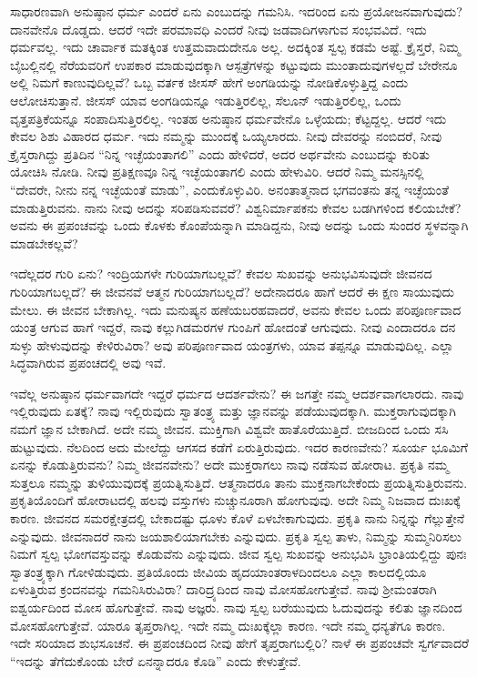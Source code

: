 ಸಾಧಾರಣವಾಗಿ ಅನುಷ್ಠಾನ ಧರ್ಮ ಎಂದರೆ ಏನು ಎಂಬುದನ್ನು ಗಮನಿಸಿ. ಇದರಿಂದ ಏನು ಪ್ರಯೋಜನವಾಗುವುದು? ದಾನವೇನೊ ದೊಡ್ಡದು. ಆದರೆ ಇದೇ ಪರಮಾವಧಿ ಎಂದರೆ ನೀವು ಜಡವಾದಿಗಳಾಗುವ ಸಂಭವವಿದೆ. ಇದು ಧರ್ಮವಲ್ಲ. ಇದು ಚಾರ್ವಾಕ ಮತಕ್ಕಿಂತ ಉತ್ತಮವಾದುದೇನೂ ಅಲ್ಲ. ಅದಕ್ಕಿಂತ ಸ್ವಲ್ಪ ಕಡಮೆ ಅಷ್ಟೆ. ಕ್ರೈಸ್ತರೆ, ನಿಮ್ಮ ಬೈಬಲ್ಲಿನಲ್ಲಿ ನೆರೆಯವರಿಗೆ ಉಪಕಾರ ಮಾಡುವುದಕ್ಕಾಗಿ ಆಸ್ಪತ್ರೆಗಳನ್ನು ಕಟ್ಟುವುದು ಮುಂತಾದುವುಗಳಲ್ಲದೆ ಬೇರೇನೂ ಅಲ್ಲಿ ನಿಮಗೆ ಕಾಣುವುದಿಲ್ಲವೆ? ಒಬ್ಬ ವರ್ತಕ ಜೀಸಸ್ ಹೇಗೆ ಅಂಗಡಿಯನ್ನು ನೋಡಿಕೊಳ್ಳುತ್ತಿದ್ದ ಎಂದು ಆಲೋಚಿಸುತ್ತಾನೆ. ಜೀಸಸ್ ಯಾವ ಅಂಗಡಿಯನ್ನೂ ಇಡುತ್ತಿರಲಿಲ್ಲ, ಸೆಲೂನ್ ಇಡುತ್ತಿರಲಿಲ್ಲ, ಒಂದು ವೃತ್ತಪತ್ರಿಕೆಯನ್ನೂ ಸಂಪಾದಿಸುತ್ತಿರಲಿಲ್ಲ. ಇಂತಹ ಅನುಷ್ಠಾನ ಧರ್ಮವೇನೊ ಒಳ್ಳೆಯದು; ಕೆಟ್ಟದ್ದಲ್ಲ. ಆದರೆ ಇದು ಕೇವಲ ಶಿಶು ವಿಹಾರದ ಧರ್ಮ. ಇದು ನಮ್ಮನ್ನು ಮುಂದಕ್ಕೆ ಒಯ್ಯಲಾರದು. ನೀವು ದೇವರನ್ನು ನಂಬಿದರೆ, ನೀವು ಕ್ರೈಸ್ತರಾಗಿದ್ದು ಪ್ರತಿದಿನ “ನಿನ್ನ ಇಚ್ಛೆಯಂತಾಗಲಿ” ಎಂದು ಹೇಳಿದರೆ, ಅದರ ಅರ್ಥವೇನು ಎಂಬುದನ್ನು ಕುರಿತು ಯೋಚಿಸಿ ನೋಡಿ. ನೀವು ಪ್ರತಿಕ್ಷಣವೂ ನಿನ್ನ ಇಚ್ಛೆಯಂತಾಗಲಿ ಎಂದು ಹೇಳುವಿರಿ. ಆದರೆ ನಿಮ್ಮ ಮನಸ್ಸಿನಲ್ಲಿ “ದೇವರೇ, ನೀನು ನನ್ನ ಇಚ್ಛೆಯಂತೆ ಮಾಡು'', ಎಂದುಕೊಳ್ಳುವಿರಿ. ಅನಂತಾತ್ಮನಾದ ಭಗವಂತನು ತನ್ನ ಇಚ್ಛೆಯಂತೆ ಮಾಡುತ್ತಿರುವನು. ನಾನು ನೀವು ಅದನ್ನು ಸರಿಪಡಿಸುವವರೆ? ವಿಶ್ವನಿರ್ಮಾಪಕನು ಕೇವಲ ಬಡಗಿಗಳಿಂದ ಕಲಿಯಬೇಕೆ? ಅವನು ಈ ಪ್ರಪಂಚವನ್ನು ಒಂದು ಕೊಳಕು ಕೊಂಪೆಯನ್ನಾಗಿ ಮಾಡಿದ್ದನು, ನೀವು ಅದನ್ನು ಒಂದು ಸುಂದರ ಸ್ಥಳವನ್ನಾಗಿ ಮಾಡಬೇಕಲ್ಲವೆ?

ಇದೆಲ್ಲದರ ಗುರಿ ಏನು? ಇಂದ್ರಿಯಗಳೇ ಗುರಿಯಾಗಬಲ್ಲವೆ? ಕೇವಲ ಸುಖವನ್ನು ಅನುಭವಿಸುವುದೇ ಜೀವನದ ಗುರಿಯಾಗಬಲ್ಲದೆ? ಈ ಜೀವನವೆ ಆತ್ಮನ ಗುರಿಯಾಗಬಲ್ಲದೆ? ಅದೇನಾದರೂ ಹಾಗೆ ಆದರೆ ಈ ಕ್ಷಣ ಸಾಯುವುದು ಮೇಲು. ಈ ಜೀವನ ಬೇಕಾಗಿಲ್ಲ. ಇದು ಮನುಷ್ಯನ ಹಣೆಯಬರಹವಾದರೆ, ಅವನು ಕೇವಲ ಒಂದು ಪರಿಪೂರ್ಣವಾದ ಯಂತ್ರ ಆಗುವ ಹಾಗೆ ಇದ್ದರೆ, ನಾವು ಕಲ್ಲುಗಿಡಮರಗಳ ಗುಂಪಿಗೆ ಹೋದಂತೆ ಆಗುವುದು. ನೀವು ಎಂದಾದರೂ ದನ ಸುಳ್ಳು ಹೇಳುವುದನ್ನು ಕೇಳಿರುವಿರಾ? ಅವು ಪರಿಪೂರ್ಣವಾದ ಯಂತ್ರಗಳು, ಯಾವ ತಪ್ಪನ್ನೂ ಮಾಡುವುದಿಲ್ಲ. ಎಲ್ಲಾ ಸಿದ್ಧವಾಗಿರುವ ಪ್ರಪಂಚದಲ್ಲಿ ಅವು ಇವೆ.

ಇವೆಲ್ಲ ಅನುಷ್ಠಾನ ಧರ್ಮವಾಗದೇ ಇದ್ದರೆ ಧರ್ಮದ ಆದರ್ಶವೇನು? ಈ ಜಗತ್ತೇ ನಮ್ಮ ಆದರ್ಶವಾಗಲಾರದು. ನಾವು ಇಲ್ಲಿರುವುದು ಏತಕ್ಕೆ? ನಾವು ಇಲ್ಲಿರುವುದು ಸ್ವಾತಂತ್ರ್ಯ ಮತ್ತು ಜ್ಞಾನವನ್ನು ಪಡೆಯುವುದಕ್ಕಾಗಿ. ಮುಕ್ತರಾಗುವುದಕ್ಕಾಗಿ ನಮಗೆ ಜ್ಞಾನ ಬೇಕಾಗಿದೆ. ಅದೇ ನಮ್ಮ ಜೀವನ. ಮುಕ್ತಿಗಾಗಿ ವಿಶ್ವವೇ ಹಾತೊರೆಯುತ್ತಿದೆ. ಬೀಜದಿಂದ ಒಂದು ಸಸಿ ಹುಟ್ಟುವುದು. ನೆಲದಿಂದ ಅದು ಮೇಲೆದ್ದು ಆಗಸದ ಕಡೆಗೆ ಏರುತ್ತಿರುವುದು. ಇದರ ಕಾರಣವೇನು? ಸೂರ್ಯ ಭೂಮಿಗೆ ಏನನ್ನು ಕೊಡುತ್ತಿರುವನು? ನಿಮ್ಮ ಜೀವನವೇನು? ಅದೇ ಮುಕ್ತರಾಗಲು ನಾವು ನಡೆಸುವ ಹೋರಾಟ. ಪ್ರಕೃತಿ ನಮ್ಮ ಸುತ್ತಲೂ ನಮ್ಮನ್ನು ತುಳಿಯುವುದಕ್ಕೆ ಪ್ರಯತ್ನಿಸುತ್ತಿದೆ. ಆತ್ಮನಾದರೂ ತಾನು ಮುಕ್ತನಾಗಬೇಕೆಂದು ಪ್ರಯತ್ನಿಸುತ್ತಿರುವನು. ಪ್ರಕೃತಿಯೊಂದಿಗೆ ಹೋರಾಟದಲ್ಲಿ ಹಲವು ವಸ್ತುಗಳು ನುಚ್ಚುನೂರಾಗಿ ಹೋಗುವುವು. ಅದೇ ನಿಮ್ಮ ನಿಜವಾದ ದುಃಖಕ್ಕೆ ಕಾರಣ. ಜೀವನದ ಸಮರಕ್ಷೇತ್ರದಲ್ಲಿ ಬೇಕಾದಷ್ಟು ಧೂಳು ಕೊಳೆ ಏಳಬೇಕಾಗುವುದು. ಪ್ರಕೃತಿ ನಾನು ನಿನ್ನನ್ನು ಗೆಲ್ಲುತ್ತೇನೆ ಎನ್ನುವುದು. ಜೀವನಾದರೆ ನಾನು ಜಯಶಾಲಿಯಾಗಬೇಕು ಎನ್ನುವುದು. ಪ್ರಕೃತಿ ಸ್ವಲ್ಪ ತಾಳು, ನಿಮ್ಮನ್ನು ಸುಮ್ಮನಿರಿಸಲು ನಿಮಗೆ ಸ್ವಲ್ಪ ಭೋಗವಸ್ತುವನ್ನು ಕೊಡುವೆನು ಎನ್ನುವುದು. ಜೀವ ಸ್ವಲ್ಪ ಸುಖವನ್ನು ಅನುಭವಿಸಿ ಭ್ರಾಂತಿಯಲ್ಲಿದ್ದು ಪುನಃ ಸ್ವಾತಂತ್ರ್ಯಕ್ಕಾಗಿ ಗೋಳಿಡುವುದು. ಪ್ರತಿಯೊಂದು ಜೀವಿಯ ಹೃದಯಾಂತರಾಳದಿಂದಲೂ ಎಲ್ಲಾ ಕಾಲದಲ್ಲಿಯೂ ಏಳುತ್ತಿರುವ ಕ್ರಂದನವನ್ನು ಗಮನಿಸಿರುವಿರಾ? ದಾರಿದ್ರ್ಯದಿಂದ ನಾವು ಮೋಸಹೋಗುತ್ತೇವೆ. ನಾವು ಶ‍್ರೀಮಂತರಾಗಿ ಐಶ್ವರ್ಯದಿಂದ ಮೋಸ ಹೊಗುತ್ತೇವೆ. ನಾವು ಅಜ್ಞರು. ನಾವು ಸ್ವಲ್ಪ ಬರೆಯುವುದು ಓದುವುದನ್ನು ಕಲಿತು ಜ್ಞಾನದಿಂದ ಮೋಸಹೋಗುತ್ತೇವೆ. ಯಾರೂ ತೃಪ್ತರಾಗಿಲ್ಲ. ಇದೇ ನಮ್ಮ ದುಃಖಕ್ಕೆಲ್ಲಾ ಕಾರಣ. ಇದೇ ನಮ್ಮ ಧನ್ಯತೆಗೂ ಕಾರಣ. ಇದೇ ಸರಿಯಾದ ಶುಭಸೂಚನೆ. ಈ ಪ್ರಪಂಚದಿಂದ ನೀವು ಹೇಗೆ ತೃಪ್ತರಾಗಬಲ್ಲಿರಿ? ನಾಳೆ ಈ ಪ್ರಪಂಚವೇ ಸ್ವರ್ಗವಾದರೆ “ಇದನ್ನು ತೆಗೆದುಕೊಂಡು ಬೇರೆ ಏನನ್ನಾದರೂ ಕೊಡಿ'' ಎಂದು ಕೇಳುತ್ತೇವೆ.

